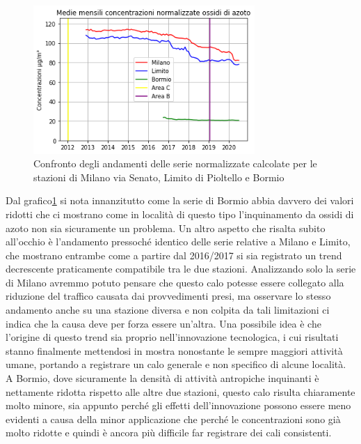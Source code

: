 \documentclass[a4paper]{report}
\begin{document}
\begin{figure}[h]
\centering
\includegraphics[width=0.75\textwidth]{nox_traffico}
\caption{Confronto degli andamenti delle serie normalizzate calcolate per le stazioni di Milano via Senato, Limito di Pioltello e Bormio}
\label{fig:nox_traffico}
\end{figure}

Dal grafico\ref{fig:nox_traffico} si nota innanzitutto come la serie di Bormio abbia davvero dei valori ridotti che ci mostrano come in località di questo tipo l'inquinamento da ossidi di azoto non sia sicuramente un problema.
Un altro aspetto che risalta subito all'occhio è l'andamento pressoché identico delle serie relative a Milano e Limito, che mostrano entrambe come a partire dal 2016/2017 si sia registrato un trend decrescente praticamente compatibile tra le due stazioni. Analizzando solo la serie di Milano avremmo potuto pensare che questo calo potesse essere collegato alla riduzione del traffico causata dai provvedimenti presi, ma osservare lo stesso andamento anche su una stazione diversa e non colpita da tali limitazioni ci indica che la causa deve per forza essere un'altra. Una possibile idea è che l'origine di questo trend sia proprio nell'innovazione tecnologica, i cui risultati stanno finalmente mettendosi in mostra nonostante le sempre maggiori attività umane, portando a registrare un calo generale e non specifico di alcune località. A Bormio, dove sicuramente la densità di attività antropiche inquinanti è nettamente ridotta rispetto alle altre due stazioni, questo calo risulta chiaramente molto minore, sia appunto perché gli effetti dell'innovazione possono essere meno evidenti a causa della minor applicazione che perché le concentrazioni sono già molto ridotte e quindi è ancora più difficile far registrare dei cali consistenti.

\end{document}
